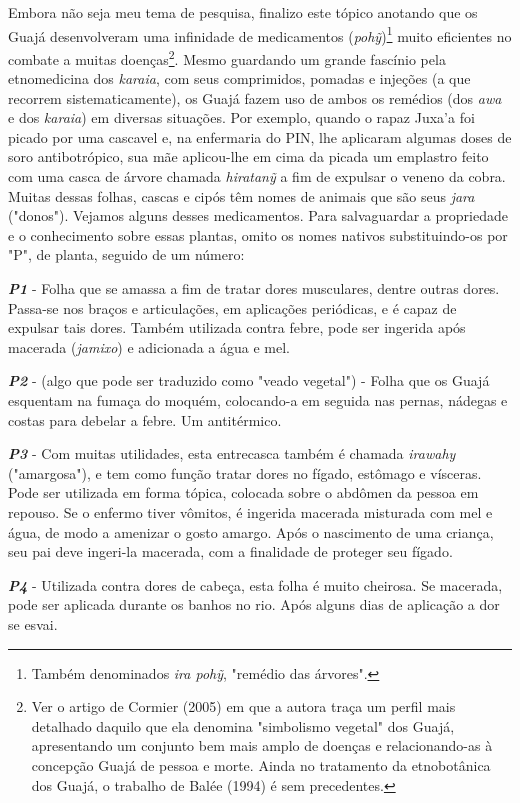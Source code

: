 Embora não seja meu tema de pesquisa, finalizo este tópico anotando que
os Guajá desenvolveram uma infinidade de medicamentos
(\emph{pohỹ})\footnote{Também denominados \emph{ira pohỹ}, "remédio das
  árvores".} muito eficientes no combate a muitas doenças\footnote{Ver o
  artigo de Cormier (2005) em que a autora traça um perfil mais
  detalhado daquilo que ela denomina "simbolismo vegetal" dos Guajá,
  apresentando um conjunto bem mais amplo de doenças e relacionando-as à
  concepção Guajá de pessoa e morte. Ainda no tratamento da etnobotânica
  dos Guajá, o trabalho de Balée (1994) é sem precedentes.}. Mesmo
guardando um grande fascínio pela etnomedicina dos \emph{karaia}, com
seus comprimidos, pomadas e injeções (a que recorrem sistematicamente),
os Guajá fazem uso de ambos os remédios (dos \emph{awa} e dos
\emph{karaia}) em diversas situações. Por exemplo, quando o rapaz Juxa'a
foi picado por uma cascavel e, na enfermaria do PIN, lhe aplicaram
algumas doses de soro antibotrópico, sua mãe aplicou-lhe em cima da
picada um emplastro feito com uma casca de árvore chamada
\emph{hiratanỹ} a fim de expulsar o veneno da cobra. Muitas dessas
folhas, cascas e cipós têm nomes de animais que são seus \emph{jara}
("donos"). Vejamos alguns desses medicamentos. Para salvaguardar a
propriedade e o conhecimento sobre essas plantas, omito os nomes nativos
substituindo-os por "P", de planta, seguido de um número:

\emph{\textbf{P1}} - Folha que se amassa a fim de tratar dores
musculares, dentre outras dores. Passa-se nos braços e articulações, em
aplicações periódicas, e é capaz de expulsar tais dores. Também
utilizada contra febre, pode ser ingerida após macerada (\emph{jamixo})
e adicionada a água e mel.

\emph{\textbf{P2}} - (algo que pode ser traduzido como "veado vegetal")
- Folha que os Guajá esquentam na fumaça do moquém, colocando-a em
seguida nas pernas, nádegas e costas para debelar a febre. Um
antitérmico.

\emph{\textbf{P3}} - Com muitas utilidades, esta entrecasca também é
chamada \emph{irawahy} ("amargosa"), e tem como função tratar dores no
fígado, estômago e vísceras. Pode ser utilizada em forma tópica,
colocada sobre o abdômen da pessoa em repouso. Se o enfermo tiver
vômitos, é ingerida macerada misturada com mel e água, de modo a
amenizar o gosto amargo. Após o nascimento de uma criança, seu pai deve
ingeri-la macerada, com a finalidade de proteger seu fígado.

\emph{\textbf{P4}} - Utilizada contra dores de cabeça, esta folha é
muito cheirosa. Se macerada, pode ser aplicada durante os banhos no rio.
Após alguns dias de aplicação a dor se esvai.

